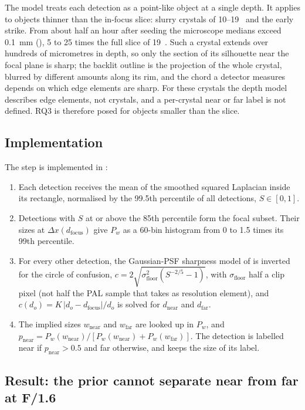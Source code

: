 The model treats each detection as a point-like object at a single depth. It applies to objects thinner than the
in-focus slice: slurry crystals of 10--19~\um{} and the early strike. From about half an hour after seeding the
microscope medians exceed 0.1~mm (), 5 to 25 times the full slice of 19~\um. Such a crystal
extends over hundreds of micrometres in depth, so only the section of its silhouette near the focal plane is sharp; the
backlit outline is the projection of the whole crystal, blurred by different amounts along its rim, and the chord a
detector measures depends on which edge elements are sharp. For these crystals the depth model describes edge
elements, not crystals, and a per-crystal near or far label is not defined. RQ3 is therefore posed for objects smaller
than the slice.

\subsection{Implementation}\label{sec:impl}

The step is implemented in :
\begin{enumerate}
\item Each detection receives the mean of the smoothed squared Laplacian inside its rectangle, normalised by the
99.5th percentile of all detections, $S \in [0, 1]$.
\item Detections with $S$ at or above the 85th percentile form the focal subset. Their sizes at
$\Delta x(d_\mathrm{focus})$ give $P_w$ as a 60-bin histogram from 0 to 1.5 times its 99th percentile.
\item For every other detection, the Gaussian-PSF sharpness model of  is inverted for the circle of
confusion, $c = 2\sqrt{\sigma_\mathrm{floor}^2 (S^{-2/5} - 1)}$, with $\sigma_\mathrm{floor}$ half a clip pixel (not half
the PAL sample that  takes as resolution element), and
$c(d_o) = K\,|d_o - d_\mathrm{focus}|/d_o$ is solved for $d_\mathrm{near}$ and $d_\mathrm{far}$.
\item The implied sizes $w_\mathrm{near}$ and $w_\mathrm{far}$ are looked up in $P_w$, and
$p_\mathrm{near} = P_w(w_\mathrm{near}) / [P_w(w_\mathrm{near}) + P_w(w_\mathrm{far})]$. The detection is labelled
near if $p_\mathrm{near} > 0.5$ and far otherwise, and keeps the size of its label.
\end{enumerate}

\subsection{Result: the prior cannot separate near from far at F/1.6}\label{sec:disamb-result}

